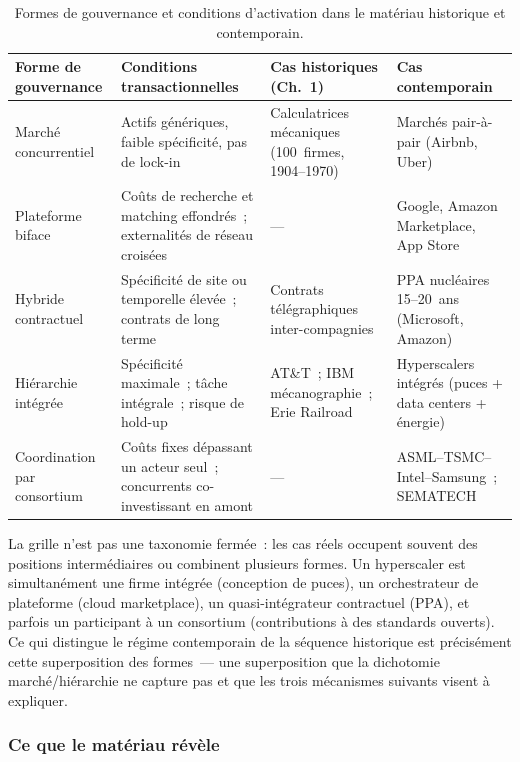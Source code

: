 \begin{table}[htbp]
\centering
\small
\caption{Formes de gouvernance et conditions d'activation dans le matériau historique et contemporain.}
\label{tab:d7-gouvernance}
\begin{tabular}{p{2.8cm} p{3.5cm} p{3.2cm} p{3.2cm}}
\toprule
\textbf{Forme de gouvernance} & \textbf{Conditions transactionnelles} & \textbf{Cas historiques (Ch.~1)} & \textbf{Cas contemporain} \\
\midrule
Marché concurrentiel & Actifs génériques, faible spécificité, pas de lock-in & Calculatrices mécaniques (100~firmes, 1904--1970) & Marchés pair-à-pair (Airbnb, Uber) \\[6pt]
Plateforme biface & Coûts de recherche et matching effondrés~; externalités de réseau croisées & --- & Google, Amazon Marketplace, App Store \\[6pt]
Hybride contractuel & Spécificité de site ou temporelle élevée~; contrats de long terme & Contrats télégraphiques inter-compagnies & PPA nucléaires 15--20~ans (Microsoft, Amazon) \\[6pt]
Hiérarchie intégrée & Spécificité maximale~; tâche intégrale~; risque de hold-up & AT\&T~; IBM mécanographie~; Erie Railroad & Hyperscalers intégrés (puces + data centers + énergie) \\[6pt]
Coordination par consortium & Coûts fixes dépassant un acteur seul~; concurrents co-investissant en amont & --- & ASML--TSMC--Intel--Samsung~; SEMATECH \\
\bottomrule
\end{tabular}
\end{table}

La grille n'est pas une taxonomie fermée~: les cas réels occupent souvent des positions intermédiaires ou combinent plusieurs formes. Un hyperscaler est simultanément une firme intégrée (conception de puces), un orchestrateur de plateforme (cloud marketplace), un quasi-intégrateur contractuel (PPA), et parfois un participant à un consortium (contributions à des standards ouverts). Ce qui distingue le régime contemporain de la séquence historique est précisément cette superposition des formes~--- une superposition que la dichotomie marché/hiérarchie ne capture pas et que les trois mécanismes suivants visent à expliquer.


\subsubsection{Ce que le matériau révèle}


